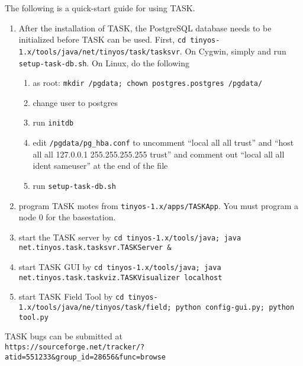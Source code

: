 \documentclass[10pt,letterpaper]{article}
\begin{document}
The following is a quick-start guide for using TASK.
\begin{enumerate}
\item After the installation of TASK, the PostgreSQL database needs to be
initialized before TASK can be used.  First, {\tt cd tinyos-1.x/tools/java/net/tinyos/task/tasksvr}.  On Cygwin, simply  and run {\tt setup-task-db.sh}.  On Linux, do the following
\begin{enumerate}
\item as root: {\tt mkdir /pgdata; chown postgres.postgres /pgdata/}
\item change user to postgres
\item run {\tt initdb}
\item edit {\tt /pgdata/pg\_hba.conf} to uncomment ``local all all trust''
and ``host all all 127.0.0.1 255.255.255.255 trust'' and comment out ``local all all ident sameuser'' at the end of the file
\item run {\tt setup-task-db.sh}
\end{enumerate}
\item program TASK motes from {\tt tinyos-1.x/apps/TASKApp}.  You must program a
node $0$ for the basestation.
\item start the TASK server by {\tt cd tinyos-1.x/tools/java; java net.tinyos.task.tasksvr.TASKServer \&}
\item start TASK GUI by {\tt cd tinyos-1.x/tools/java; java net.tinyos.task.taskviz.TASKVisualizer localhost}
\item start TASK Field Tool by {\tt cd tinyos-1.x/tools/java/ne/tinyos/task/field; python config-gui.py; python tool.py}
\end{enumerate}

TASK bugs can be submitted at \\
{\tt https://sourceforge.net/tracker/?atid=551233\&group\_id=28656\&func=browse}
\end{document}
